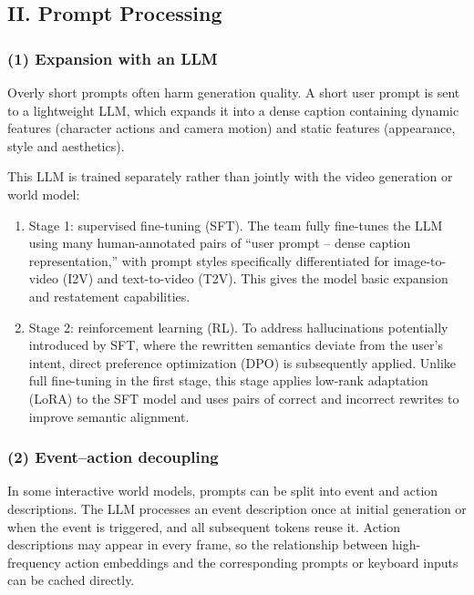 \hypertarget{ii.-prompt-processing}{%
\subsection{II. Prompt Processing}\label{ii.-prompt-processing}}

\hypertarget{expansion-with-an-llm}{%
\subsubsection{(1) Expansion with an LLM}\label{expansion-with-an-llm}}

Overly short prompts often harm generation quality. A short user prompt is sent to a lightweight LLM, which expands it into a dense caption containing dynamic features (character actions and camera motion) and static features (appearance, style and aesthetics).

This LLM is trained separately rather than jointly with the video generation or world model:

\begin{enumerate}
\def\labelenumi{\arabic{enumi}.}
\tightlist
\item
  Stage 1: supervised fine-tuning (SFT). The team fully fine-tunes the LLM using many human-annotated pairs of ``user prompt -- dense caption representation,'' with prompt styles specifically differentiated for image-to-video (I2V) and text-to-video (T2V). This gives the model basic expansion and restatement capabilities.
\item
  Stage 2: reinforcement learning (RL). To address hallucinations potentially introduced by SFT, where the rewritten semantics deviate from the user's intent, direct preference optimization (DPO) is subsequently applied. Unlike full fine-tuning in the first stage, this stage applies low-rank adaptation (LoRA) to the SFT model and uses pairs of correct and incorrect rewrites to improve semantic alignment.
\end{enumerate}

\hypertarget{eventaction-decoupling}{%
\subsubsection{(2) Event--action decoupling}\label{eventaction-decoupling}}

In some interactive world models, prompts can be split into event and action descriptions. The LLM processes an event description once at initial generation or when the event is triggered, and all subsequent tokens reuse it. Action descriptions may appear in every frame, so the relationship between high-frequency action embeddings and the corresponding prompts or keyboard inputs can be cached directly.

